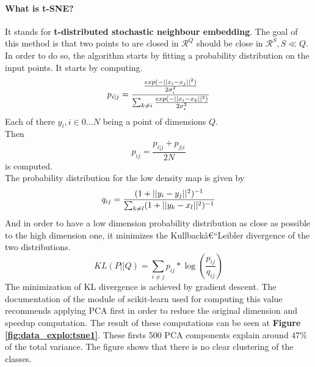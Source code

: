 \paragraph{What is t-SNE?} It stands for \textbf{t-distributed stochastic neighbour embedding}. The goal of this method is that two points to are closed in $\mathcal{R}^{Q}$ should be close in $\mathcal{R}^{S}, S \ll Q$. In order to do so, the algorithm starts by fitting a probability distribution on the input points. It starts by computing.
\begin{equation*}
 p_{i|j} = \frac{\frac{exp(-||x_i - x_j||^2)}{2 \sigma_i^2}}{\sum_{k \neq i} \frac{exp(-||x_i - x_k||^2)}{2 \sigma_i^2}}\\
\end{equation*}
Each of there $y_i, i \in 0 \dots N$ being a point of dimensions $Q$.\\
Then 
\begin{equation*}
 p_{ij} = \frac{p_{i|j} + p_{j|i} }{2N}
\end{equation*}
is computed. \\
The probability distribution for the low density map is given by 
\begin{equation*}
 q_{ij} = \frac{(1 + ||y_i - y_j||^2)^{-1}}{\sum_{k \neq l} (1 +||y_k - x_l||^2)^{-1}}\\
\end{equation*}
And in order to have a low dimension probability distribution as close as possible to the high dimension one, it minimizes the Kullbackâ€“Leibler divergence of the two distributions. 
\begin{equation*}
 KL(P||Q) = \sum_{i \neq j} p_{ij} * \log(\frac{p_{ij}}{q_{ij}})
\end{equation*}
The minimization of KL divergence is achieved by gradient descent. 
The documentation of the module of scikit-learn\cite{scikit-learn} used for computing this value recommends applying PCA first in order to reduce the original dimension and speedup computation. The result of these computations can be seen at \textbf{Figure \ref{fig:data_explo:tsne1}}. These firsts 500 PCA components explain around $47\%$ of the total variance. The figure shows that there is no clear clustering of the classes. 
